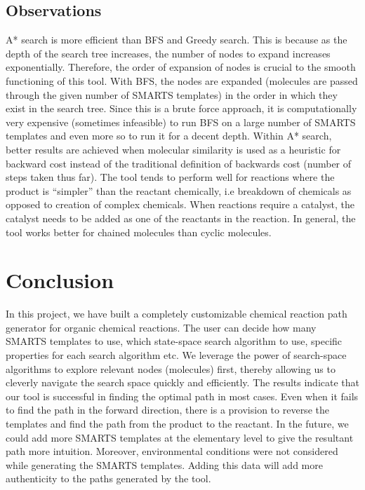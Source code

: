 \documentclass[preprint,12pt]{elsarticle}
\begin{document}
 \subsection{Observations}
 A* search is more efficient than BFS and Greedy search. This is because as the depth of the search tree increases, the number of nodes to expand increases exponentially. Therefore, the order of expansion of nodes is crucial to the smooth functioning of this tool. With BFS, the nodes are expanded (molecules are passed through the given number of SMARTS templates) in the order in which they exist in the search tree. Since this is a brute force approach, it is computationally very expensive (sometimes infeasible) to run BFS on a large number of SMARTS templates and even more so to run it for a decent depth. Within A* search, better results are achieved when molecular similarity is used as a heuristic for backward cost instead of the traditional definition of backwards cost (number of steps taken thus far). The tool tends to perform well for reactions where the product is “simpler” than the reactant chemically, i.e breakdown of chemicals as opposed to creation of complex chemicals. When reactions require a catalyst, the catalyst needs to be added as one of the reactants in the reaction. In general, the tool works better for chained molecules than cyclic molecules.

 

\section{Conclusion}
In this project, we have built a completely customizable chemical reaction path generator for organic chemical reactions. The user can decide how many SMARTS templates to use, which state-space search algorithm to use, specific properties for each search algorithm etc. We leverage the power of search-space algorithms to explore relevant nodes (molecules) first, thereby allowing us to cleverly navigate the search space quickly and efficiently. The results indicate that our tool is successful in finding the optimal path in most cases. Even when it fails to find the path in the forward direction, there is a provision to reverse the templates and find the path from the product to the reactant. In the future, we could add more SMARTS templates at the elementary level to give the resultant path more intuition. Moreover, environmental conditions were not considered while generating the SMARTS templates. Adding this data will add more authenticity to the paths generated by the tool.
\end{document}

